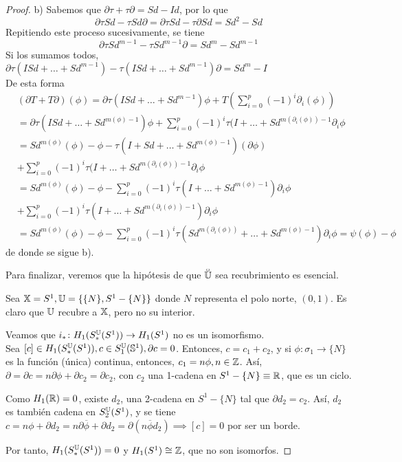 \begin{proof}
  b) Sabemos que $\partial \tau + \tau \partial = Sd - Id$, por lo que \\
  \[ \partial \tau Sd - \tau Sd \partial = \partial \tau Sd - \tau \partial Sd = Sd^2 - Sd \]
  Repitiendo este proceso sucesivamente, se tiene
  \[ \partial \tau Sd^{m - 1} - \tau Sd^{m-1} \partial = Sd^m - Sd^{m-1} \]
  Si los sumamos todos, $\partial \tau(I  Sd + \dots + Sd^{m-1}) - \tau(I  Sd + \dots + Sd^{m-1}) \partial = Sd^m - I$ \\
  De esta forma
  \begin{align*}
    &(\partial T + T \partial)(\phi) = \partial \tau(I  Sd + \dots + Sd^{m-1}) \phi + T(\sum\limits_{i = 0}^p (-1)^i \partial_i(\phi)) \\
    &= \partial \tau(I  Sd + \dots + Sd^{m(\phi)-1}) \phi + \sum\limits_{i = 0}^p (-1)^i \tau(I + \dots + Sd^{m(\partial_i(\phi)) - 1} \partial_i \phi \\
    &= Sd^{m(\phi)}(\phi) - \phi - \tau(I + Sd + \dots + Sd^{m(\phi)-1})(\partial \phi)  \\
    &+ \sum\limits_{i = 0}^p (-1)^i \tau(I + \dots + Sd^{m(\partial_i(\phi)) - 1} \partial_i \phi \\
    &= Sd^{m(\phi)}(\phi) - \phi - \sum\limits_{i = 0}^p (-1)^i \tau(I + \dots + Sd^{m(\phi) - 1}) \partial_i \phi \\
    &+ \sum\limits_{i = 0}^p (-1)^i \tau(I + \dots + Sd^{m(\partial_i(\phi)) - 1}) \partial_i \phi \\
    &= Sd^{m(\phi)}(\phi) - \phi - \sum\limits_{i = 0}^p (-1)^i \tau(Sd^{m(\partial_i(\phi))} + \dots + Sd^{m(\phi) - 1}) \partial_i \phi = \psi(\phi) - \phi
  \end{align*}
  de donde se sigue b).

  Para finalizar, veremos que la hipótesis de que $\interior{\U}$ sea recubrimiento es esencial.

  Sea ${\mathbb X} = S^1, {\mathbb U} = \{\{N\}, S^1 - \{N\}\}$ donde $N$ representa el polo norte, $(0, 1)$. Es claro que ${\mathbb U}$ recubre a ${\mathbb X}$, pero no su interior.

  Veamos que $i_* \colon H_1(S_*^{\mathbb U}(S^1)) \to H_1(S^1)$ no es un isomorfismo. \\
  Sea $[c] \in H_1(S_*^{\mathbb U}(S^1)), c \in S_1^{\mathbb U}({\mathbb S}^1), \partial c = 0$. Entonces, $c = c_1 + c_2$, y si $\phi \colon \sigma_1 \to \{N\}$ es la función
  (única) continua, entonces, $c_1 = n\phi, n \in \mathbb{Z}$. Así, $\partial = \partial c = n \partial \phi + \partial c_2 = \partial c_2$, con $c_2$ una
  1-cadena en $S^1 - \{N\} \equiv \mathbb{R}$, que es un ciclo.

  Como $H_1(\mathbb{R}) = 0$, existe $d_2$, una 2-cadena en $S^1 - \{N\}$ tal que $\partial d_2 = c_2$. Así, $d_2$ es también cadena en $S_2^{\mathbb U}(S^1)$, y se tiene
  $c = n\phi + \partial d_2 = n \partial \overline{\phi} + \partial d_2 = \partial(n\overline{\phi}  d_2) \implies [c] = 0$ por ser un borde.

  Por tanto, $H_1(S_*^{\mathbb U}(S^1)) = 0$ y $H_1(S^1) \cong \mathbb{Z}$, que no son isomorfos.
\end{proof}

